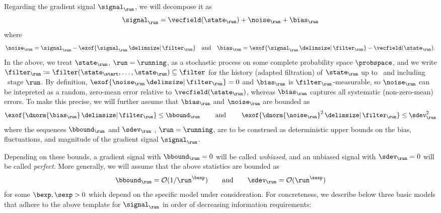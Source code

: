 Regarding the gradient signal $\curr[\signal]$, we will decompose it as
\begin{equation}
\label{eq:signal}
\curr[\signal]
	= \vecfield(\curr) + \curr[\noise] + \curr[\bias]
\end{equation}
where
\begin{equation}
\label{eq:bias-noise}
\curr[\noise]
	= \curr[\signal] - \exof{\curr[\signal] \given \curr[\filter]}
	\quad
	\text{and}
	\quad
\curr[\bias]
	= \exof{\curr[\signal] \given \curr[\filter]} - \vecfield(\curr).
\end{equation}
In the above, we treat $\curr$, $\run=\running$, as a stochastic process on some complete probability space $\probspace$, and we write $\curr[\filter] \defeq \filter(\init,\dotsc,\curr) \subseteq \filter$ for the history (adapted filtration) of $\curr$ up to \textendash\ and including \textendash\ stage $\run$.
By definition, $\exof{\curr[\noise] \given \curr[\filter]} = 0$ and $\curr[\bias]$ is $\curr[\filter]$-measurable, so $\curr[\noise]$ can be intepreted as a random, zero-mean error relative to $\vecfield(\curr)$, whereas $\curr[\bias]$ captures all systematic (non-zero-mean) errors.
To make this precise, we will further assume that $\curr[\bias]$ and  $\curr[\noise]$  are bounded as
\begin{equation}
\label{eq:errorbounds}
\exof{\dnorm{\curr[\bias]} \given \curr[\filter]}
	\leq \curr[\bbound]
	\qquad
	\text{ and }
	\qquad
\exof{\dnorm{\curr[\noise]}^{2} \given \curr[\filter]}
	\leq \curr[\sdev]^{2}
\end{equation}
where the sequences $\curr[\bbound]$ and $\curr[\sdev]$ %
, $\run=\running$, are to be construed as deterministic upper bounds on the bias, fluctuations, and magnitude of the gradient signal $\curr[\signal]$.

Depending on these bounds, a gradient signal with $\curr[\bbound]=0$ will be called \emph{unbiased},
and an unbiased signal with $\curr[\sdev] = 0$  will be called \emph{perfect}.
More generally, we will assume that the above statistics are bounded as
\begin{equation}
\label{eq:schedule}
\curr[\bbound]
	= \bigoh(1/\run^{\bexp})
	\qquad
	\text{and}
	\qquad
\curr[\sdev]
	= \bigoh(\run^{\sexp})
\end{equation}
for some $\bexp,\sexp>0$ which depend on the specific model under consideration.
For concreteness, we describe below three basic models that adhere to the above template for $\curr[\signal]$ in order of decreasing information requirements:


